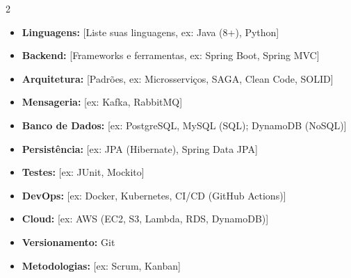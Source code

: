 \documentclass[a4paper,10pt]{article}
\begin{document}
\begin{multicols}{2}
\begin{itemize}[leftmargin=*, noitemsep]
  \item \textbf{Linguagens:} [Liste suas linguagens, ex: Java (8+), Python]
  \item \textbf{Backend:} [Frameworks e ferramentas, ex: Spring Boot, Spring MVC]
  \item \textbf{Arquitetura:} [Padrões, ex: Microsserviços, SAGA, Clean Code, SOLID]
  \item \textbf{Mensageria:} [ex: Kafka, RabbitMQ]
  \item \textbf{Banco de Dados:} [ex: PostgreSQL, MySQL (SQL); DynamoDB (NoSQL)]
  \item \textbf{Persistência:} [ex: JPA (Hibernate), Spring Data JPA]
  \item \textbf{Testes:} [ex: JUnit, Mockito]
  \item \textbf{DevOps:} [ex: Docker, Kubernetes, CI/CD (GitHub Actions)]
  \item \textbf{Cloud:} [ex: AWS (EC2, S3, Lambda, RDS, DynamoDB)]
  \item \textbf{Versionamento:} Git
  \item \textbf{Metodologias:} [ex: Scrum, Kanban]
\end{itemize}
\end{multicols}


%
%
%
%
\end{document}
